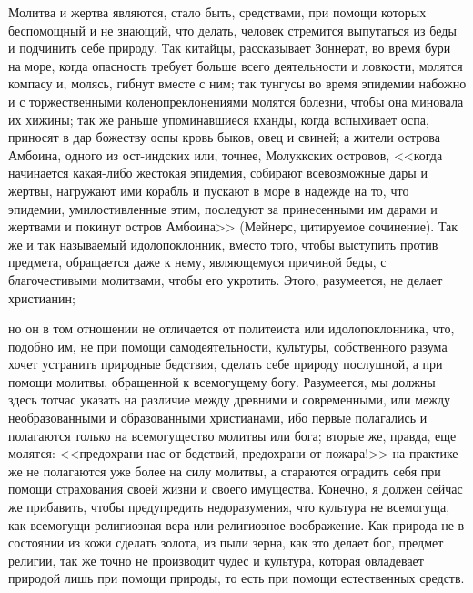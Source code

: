 \documentclass[12pt]{article}
\begin{document}
Молитва и жертва являются, стало быть, средствами, при помощи которых беспомощный и не знающий, что делать, человек стремится выпутаться из беды и подчинить себе природу. Так китайцы, рассказывает Зоннерат, во время бури на море, когда опасность требует больше всего деятельности и ловкости, молятся компасу и, молясь, гибнут вместе с ним; так тунгусы во время эпидемии набожно и с торжественными коленопреклонениями молятся болезни, чтобы она миновала их хижины; так же раньше упоминавшиеся кханды, когда вспыхивает оспа, приносят в дар божеству оспы кровь быков, овец и свиней; а жители острова Амбоина, одного из ост-индских или, точнее, Молуккских островов, <<когда начинается какая-либо жестокая эпидемия, собирают всевозможные дары и жертвы, нагружают ими корабль и пускают в море в надежде на то, что эпидемии, умилостивленные этим, последуют за принесенными им дарами и жертвами и покинут остров Амбоина>> (Мейнерс, цитируемое сочинение). Так же и так называемый идолопоклонник, вместо того, чтобы выступить против предмета, обращается даже к нему, являющемуся причиной беды, с благочестивыми молитвами, чтобы его укротить. Этого, разумеется, не делает христианин; 

но он в том отношении не отличается от политеиста или идолопоклонника, что, подобно им, не при помощи самодеятельности, культуры, собственного разума хочет устранить природные бедствия, сделать себе природу послушной, а при помощи молитвы, обращенной к всемогущему богу. Разумеется, мы должны здесь тотчас указать на различие между древними и современными, или между необразованными и образованными христианами, ибо первые полагались и полагаются только на всемогущество молитвы или бога; вторые же, правда, еще молятся: <<предохрани нас от бедствий, предохрани от пожара!>> на практике же не полагаются уже более на силу молитвы, а стараются оградить себя при помощи страхования своей жизни и своего имущества. Конечно, я должен сейчас же прибавить, чтобы предупредить недоразумения, что культура не всемогуща, как всемогущи религиозная вера или религиозное воображение. Как природа не в состоянии из кожи сделать золота, из пыли зерна, как это делает бог, предмет религии, так же точно не производит чудес и культура, которая овладевает природой лишь при помощи природы, то есть при помощи естественных средств. 
\end{document}
